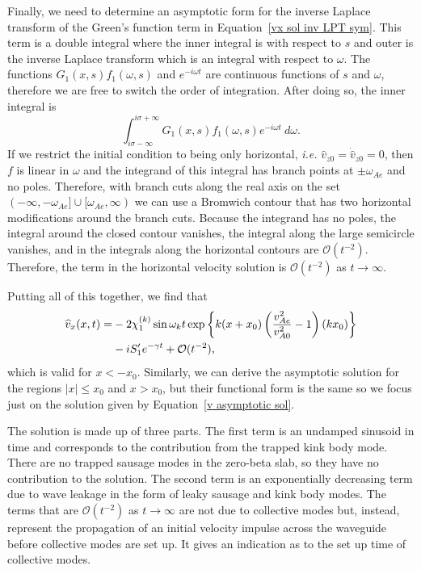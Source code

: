 Finally, we need to determine an asymptotic form for the inverse Laplace transform of the Green's function term in Equation~\eqref{vx sol inv LPT sym}. This term is a double integral where the inner integral is with respect to $s$ and outer is the inverse Laplace transform which is an integral with respect to $\omega$. The functions $G_1(x, s)f_1(\omega, s)$ and $e^{-i\omega t}$ are continuous functions of $s$ and $\omega$, therefore we are free to switch the order of integration. After doing so, the inner integral is
\begin{equation}
\int_{i\sigma - \infty}^{i\sigma 
+ \infty} G_1(x, s)f_1(\omega, s) e^{-i\omega t} ~d\omega.
\end{equation}
If we restrict the initial condition to being only horizontal, \textit{i.e.} $\widehat{v}_{z0} = \dot{\widehat{v}}_{z0} = 0$, then $f$ is linear in $\omega$ and the integrand of this integral has branch points at $\pm \omega_{Ae}$ and no poles. Therefore, with branch cuts along the real axis on the set $(-\infty, -\omega_{Ae}] \cup [\omega_{Ae}, \infty)$ we can use a Bromwich contour that has two horizontal modifications around the branch cuts. Because the integrand has no poles, the integral around the closed contour vanishes, the integral along the large semicircle vanishes, and in the integrals along the horizontal contours are $\mathcal{O}(t^{-2})$. Therefore, the term in the horizontal velocity solution is $\mathcal{O}(t^{-2})$ as $t \to \infty$.

Putting all of this together, we find that
\begin{align}
\widehat{v}_x(x, t) = &-2\chi_1^{(k)}\sin{\omega_k t}\exp\left\{ k(x + x_0)\left( \frac{v_{Ae}^2}{v_{A0}^2} - 1 \right) (kx_0) \right\} \notag \\
&- iS'_1 e^{-\gamma t} + \mathcal{O}(t^{-2}),
\label{v asymptotic sol}
\end{align}
which is valid for $x < -x_0$. Similarly, we can derive the asymptotic solution for the regions $|x| \leq x_0$ and $x > x_0$, but their functional form is the same so we focus just on the solution given by Equation~\eqref{v asymptotic sol}.

The solution is made up of three parts. The first term is an undamped sinusoid in time and corresponds to the contribution from the trapped kink body mode. There are no trapped sausage modes in the zero-beta slab, so they have no contribution to the solution. The second term is an exponentially decreasing term due to wave leakage in the form of leaky sausage and kink body modes. The terms that are $\mathcal{O}(t^{-2})$ as $t \to \infty$ are not due to collective modes but, instead, represent the propagation of an initial velocity impulse across the waveguide before collective modes are set up. It gives an indication as to the set up time of collective modes.

